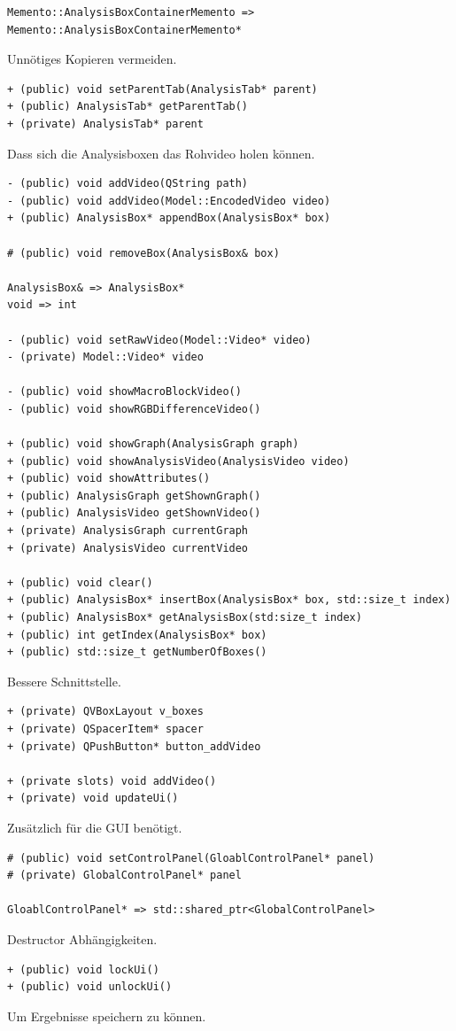 \documentclass{scrartcl}
\begin{document}
{\begin{verbatim}
Memento::AnalysisBoxContainerMemento => Memento::AnalysisBoxContainerMemento*
\end{verbatim}
Unnötiges Kopieren vermeiden.
\bigskip
\begin{verbatim}
+ (public) void setParentTab(AnalysisTab* parent)
+ (public) AnalysisTab* getParentTab()
+ (private) AnalysisTab* parent
\end{verbatim}
Dass sich die Analysisboxen das Rohvideo holen können.
\bigskip
\begin{verbatim}
- (public) void addVideo(QString path)
- (public) void addVideo(Model::EncodedVideo video)
+ (public) AnalysisBox* appendBox(AnalysisBox* box)

# (public) void removeBox(AnalysisBox& box)

AnalysisBox& => AnalysisBox*
void => int

- (public) void setRawVideo(Model::Video* video)
- (private) Model::Video* video

- (public) void showMacroBlockVideo()
- (public) void showRGBDifferenceVideo()

+ (public) void showGraph(AnalysisGraph graph)
+ (public) void showAnalysisVideo(AnalysisVideo video)
+ (public) void showAttributes()
+ (public) AnalysisGraph getShownGraph()
+ (public) AnalysisVideo getShownVideo()
+ (private) AnalysisGraph currentGraph
+ (private) AnalysisVideo currentVideo

+ (public) void clear()
+ (public) AnalysisBox* insertBox(AnalysisBox* box, std::size_t index)
+ (public) AnalysisBox* getAnalysisBox(std:size_t index)
+ (public) int getIndex(AnalysisBox* box)
+ (public) std::size_t getNumberOfBoxes()
\end{verbatim}
Bessere Schnittstelle.
\bigskip
\begin{verbatim}
+ (private) QVBoxLayout v_boxes
+ (private) QSpacerItem* spacer
+ (private) QPushButton* button_addVideo

+ (private slots) void addVideo()
+ (private) void updateUi()
\end{verbatim}
Zusätzlich für die GUI benötigt.
\bigskip
\begin{verbatim}
# (public) void setControlPanel(GloablControlPanel* panel)
# (private) GlobalControlPanel* panel

GloablControlPanel* => std::shared_ptr<GlobalControlPanel>
\end{verbatim}
Destructor Abhängigkeiten.
\begin{verbatim}
+ (public) void lockUi()
+ (public) void unlockUi()
\end{verbatim}
Um Ergebnisse speichern zu können.
\newpage
}
\end{document}
